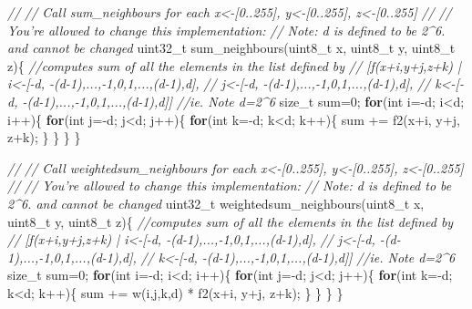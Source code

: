 \documentclass[]{book}
\newenvironment{Shaded}{}{}
\newcommand{\KeywordTok}[1]{\textbf{{#1}}}
\newcommand{\DataTypeTok}[1]{\textcolor[rgb]{0.50,0.00,0.00}{{#1}}}
\newcommand{\DecValTok}[1]{\textcolor[rgb]{0.00,0.00,1.00}{{#1}}}
\newcommand{\CommentTok}[1]{\textcolor[rgb]{0.50,0.50,0.50}{\textit{{#1}}}}
\newcommand{\NormalTok}[1]{{#1}}
\begin{document}
\begin{Shaded}
\begin{Highlighting}[]
        \CommentTok{//}
        \CommentTok{// Call sum_neighbours for each x<-[0..255], y<-[0..255], z<-[0..255]}
        \CommentTok{//}
        \CommentTok{// You're allowed to change this implementation: }
        \CommentTok{// Note: d is defined to be 2^6. and cannot be changed}
        \DataTypeTok{uint32_t} \NormalTok{sum_neighbours(}\DataTypeTok{uint8_t} \NormalTok{x, }\DataTypeTok{uint8_t} \NormalTok{y, }\DataTypeTok{uint8_t} \NormalTok{z)\{}
           \CommentTok{//computes sum of all the elements in the list defined by }
           \CommentTok{//       [f(x+i,y+j,z+k) | i<-[-d, -(d-1),...,-1,0,1,...,(d-1),d], }
           \CommentTok{//                         j<-[-d, -(d-1),...,-1,0,1,...,(d-1),d], }
           \CommentTok{//                         k<-[-d, -(d-1),...,-1,0,1,...,(d-1),d]]}
           \CommentTok{//ie.  Note d=2^6}
           \NormalTok{size_t sum=}\DecValTok{0}\NormalTok{;}
            \KeywordTok{for}\NormalTok{(}\DataTypeTok{int} \NormalTok{i=-d; i<d; i++)\{}
              \KeywordTok{for}\NormalTok{(}\DataTypeTok{int} \NormalTok{j=-d; j<d; j++)\{}
                 \KeywordTok{for}\NormalTok{(}\DataTypeTok{int} \NormalTok{k=-d; k<d; k++)\{}
                   \NormalTok{sum += f2(x+i, y+j, z+k);}
                 \NormalTok{\}}
              \NormalTok{\}}
            \NormalTok{\}}
        \NormalTok{\}}

        \CommentTok{//}
        \CommentTok{// Call weightedsum_neighbours for each x<-[0..255], y<-[0..255], z<-[0..255]}
        \CommentTok{//}
        \CommentTok{// You're allowed to change this implementation: }
        \CommentTok{// Note: d is defined to be 2^6. and cannot be changed}
        \DataTypeTok{uint32_t} \NormalTok{weightedsum_neighbours(}\DataTypeTok{uint8_t} \NormalTok{x, }\DataTypeTok{uint8_t} \NormalTok{y, }\DataTypeTok{uint8_t} \NormalTok{z)\{}
           \CommentTok{//computes sum of all the elements in the list defined by }
           \CommentTok{//       [f(x+i,y+j,z+k) | i<-[-d, -(d-1),...,-1,0,1,...,(d-1),d], }
           \CommentTok{//                         j<-[-d, -(d-1),...,-1,0,1,...,(d-1),d], }
           \CommentTok{//                         k<-[-d, -(d-1),...,-1,0,1,...,(d-1),d]]}
           \CommentTok{//ie.  Note d=2^6}
           \NormalTok{size_t sum=}\DecValTok{0}\NormalTok{;}
            \KeywordTok{for}\NormalTok{(}\DataTypeTok{int} \NormalTok{i=-d; i<d; i++)\{}
              \KeywordTok{for}\NormalTok{(}\DataTypeTok{int} \NormalTok{j=-d; j<d; j++)\{}
                 \KeywordTok{for}\NormalTok{(}\DataTypeTok{int} \NormalTok{k=-d; k<d; k++)\{}
                   \NormalTok{sum += w(i,j,k,d) * f2(x+i, y+j, z+k);}
                 \NormalTok{\}}
              \NormalTok{\}}
            \NormalTok{\}}
        \NormalTok{\}}


\end{Highlighting}
\end{Shaded}
\end{document}
